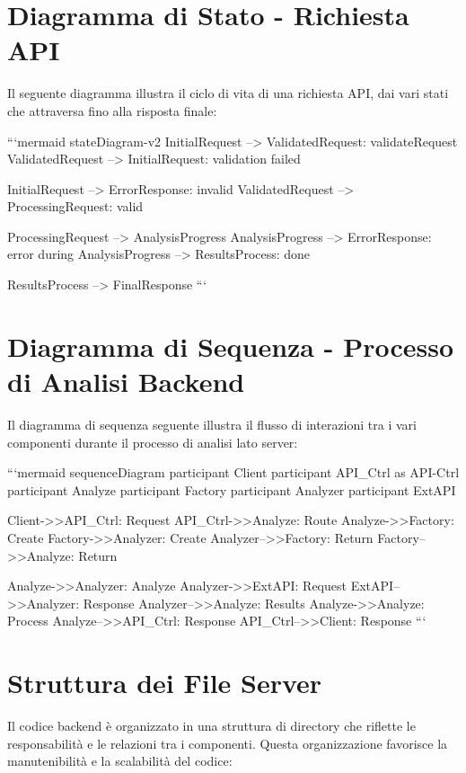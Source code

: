 \section{Diagramma di Stato - Richiesta API}
Il seguente diagramma illustra il ciclo di vita di una richiesta API, dai vari stati che attraversa fino alla risposta finale:

```mermaid
stateDiagram-v2
    InitialRequest --> ValidatedRequest: validateRequest
    ValidatedRequest --> InitialRequest: validation failed
    
    InitialRequest --> ErrorResponse: invalid
    ValidatedRequest --> ProcessingRequest: valid
    
    ProcessingRequest --> AnalysisProgress
    AnalysisProgress --> ErrorResponse: error during
    AnalysisProgress --> ResultsProcess: done
    
    ResultsProcess --> FinalResponse
```


\section{Diagramma di Sequenza - Processo di Analisi Backend}
Il diagramma di sequenza seguente illustra il flusso di interazioni tra i vari componenti durante il processo di analisi lato server:

```mermaid
sequenceDiagram
    participant Client
    participant API_Ctrl as API-Ctrl
    participant Analyze
    participant Factory
    participant Analyzer
    participant ExtAPI
    
    Client->>API_Ctrl: Request
    API_Ctrl->>Analyze: Route
    Analyze->>Factory: Create
    Factory->>Analyzer: Create
    Analyzer-->>Factory: Return
    Factory-->>Analyze: Return
    
    Analyze->>Analyzer: Analyze
    Analyzer->>ExtAPI: Request
    ExtAPI-->>Analyzer: Response
    Analyzer-->>Analyze: Results
    Analyze->>Analyze: Process
    Analyze-->>API_Ctrl: Response
    API_Ctrl-->>Client: Response
```

\section{Struttura dei File Server}
Il codice backend è organizzato in una struttura di directory che riflette le responsabilità e le relazioni tra i componenti. Questa organizzazione favorisce la manutenibilità e la scalabilità del codice:

